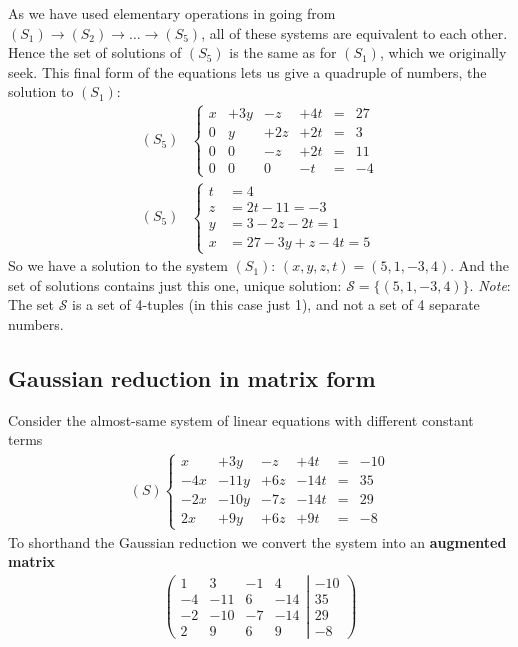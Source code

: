 As we have used elementary operations in going from $(S_1) \to (S_2) \to \dots \to (S_5)$, all of these systems are equivalent to each other. Hence the set of solutions of $(S_5)$ is the same as for $(S_1)$, which we originally seek. This final form of the equations lets us give a quadruple of numbers, the solution to $(S_1)$:
\begin{align*}
(S_5)
&\left\{
\begin{matrix}
   x & +3y & -z & +4t &=& 27 \\
   0  & y & +2z & +2t &=& 3 \\
   0  & 0 & -z & +2t &=&  11 \\
   0  & 0 & 0 & -t &=& -4
\end{matrix}
\right. \\
(S_5)
&\left\{
\begin{array}{ll}
   t &= 4 \\
   z &= 2t -  11 = -3\\
   y &= 3 -2z - 2t = 1\\
   x &= 27 - 3y + z - 4t = 5 	
\end{array}
\right. 
\end{align*}
So we have a solution to the system $(S_1)$: $(x,y,z,t)=(5,1,-3,4)$. And the set of solutions contains just this one, unique solution: $\mathcal{S}=\{(5,1,-3,4)\}$. \textit{Note}: The set $\mathcal{S}$ is a set of 4-tuples (in this case just 1), and not a set of 4 separate numbers.


\subsection*{Gaussian reduction in matrix form}

Consider the almost-same system of linear equations with different constant terms
\begin{align*}
(S)
\left\{
\begin{matrix}
    x &+  3y &-  z &+  4t &=&  -10 \\
  -4x &- 11y &+ 6z &- 14t &=&   35 \\
  -2x &- 10y &- 7z &- 14t &=&   29 \\
   2x &+  9y &+ 6z &+  9t &=&   -8
\end{matrix}
\right.
\end{align*}
To shorthand the Gaussian reduction we convert the system into an \textbf{augmented matrix}
\begin{align*}
\left(
	\begin{matrix}
	   1 &   3 & -1 &   4 \\
	  -4 & -11 &  6 & -14 \\
	  -2 & -10 & -7 & -14 \\
	   2 &   9 &  6 &   9
	\end{matrix}
  \left|
	\begin{matrix}
	 -10 \\
	  35 \\
	  29 \\
	  -8
	\end{matrix}
  \right.
\right)
\end{align*}

